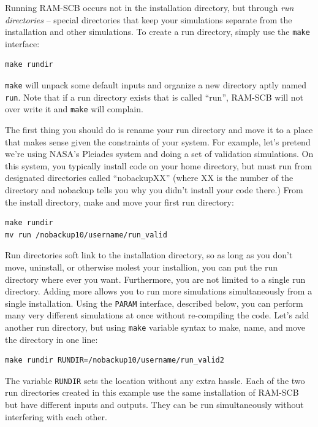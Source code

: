 Running RAM-SCB occurs not in the installation directory, but through 
\textit{run directories} -- special directories that keep your simulations 
separate from the installation and other simulations.  To create a run 
directory, simply use the {\tt make} interface:

\begin{verbatim}
make rundir
\end{verbatim}
\noindent
{\tt make} will unpack some default inputs and organize a new directory
aptly named {\tt run}.  Note that if a run directory exists that is called
``run'', RAM-SCB will not over write it and {\tt make} will complain.  

The first thing you should do is rename your run directory and move it to
a place that makes sense given the constraints of your system.  For example,
let's pretend we're using NASA's Pleiades system and doing a set of validation
simulations.  On this system, you typically install code on your home 
directory, but must run from designated directories called ``nobackupXX'' 
(where XX is the number of the directory and nobackup tells you why you 
didn't install your code there.)  From the install directory, make and move
your first run directory:

\begin{verbatim}
make rundir
mv run /nobackup10/username/run_valid
\end{verbatim}
\noindent

Run directories soft link to the installation directory, so as long as you 
don't move, uninstall, or otherwise molest your installion, you can put the
run directory where ever you want.  Furthermore, you are not limited to a single
run directory.  Adding more allows you to run more simulations simultaneously
from a single installation.  Using the {\tt PARAM} interface, described below,
you can perform many very different simulations at once without re-compiling
the code.  Let's add another run directory, but using {\tt make} variable
syntax to make, name, and move the directory in one line:

\begin{verbatim}
make rundir RUNDIR=/nobackup10/username/run_valid2
\end{verbatim}
\noindent
The variable {\tt RUNDIR} sets the location without any extra hassle.  Each
of the two run directories created in this example use the same installation
of RAM-SCB but have different inputs and outputs.  They can be run 
simultaneously without interfering with each other.

